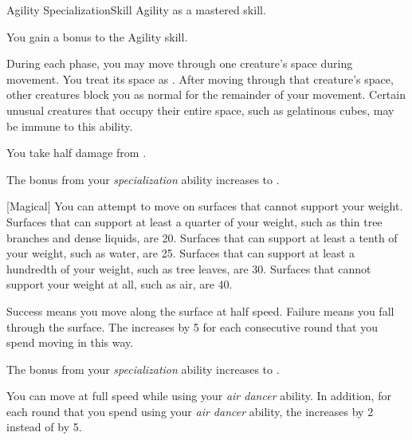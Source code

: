     \begin{feat}{Agility Specialization}{Skill}
        \featpre Agility as a mastered skill.

         You gain a  bonus to the Agility skill.

         During each phase, you may move through one creature's space during movement.
        You treat its space as .
        After moving through that creature's space, other creatures block you as normal for the remainder of your movement.
        Certain unusual creatures that occupy their entire space, such as gelatinous cubes, may be immune to this ability.

         You take half damage from .

         The bonus from your \textit{specialization} ability increases to .

        [Magical] You can attempt to move on surfaces that cannot support your weight.
        Surfaces that can support at least a quarter of your weight, such as thin tree branches and dense liquids, are  20.
        Surfaces that can support at least a tenth of your weight, such as water, are  25.
        Surfaces that can support at least a hundredth of your weight, such as tree leaves, are  30.
        Surfaces that cannot support your weight at all, such as air, are  40.

        Success means you move along the surface at half speed.
        Failure means you fall through the surface.
        The  increases by 5 for each consecutive round that you spend moving in this way.

         The bonus from your \textit{specialization} ability increases to .

         You can move at full speed while using your \textit{air dancer} ability.
        In addition, for each round that you spend using your \textit{air dancer} ability, the  increases by 2 instead of by 5.
    \end{feat}

